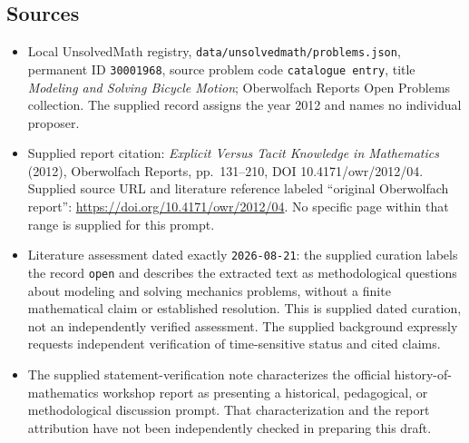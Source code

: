 \documentclass[11pt]{article}
\begin{document}
\subsection{Sources}
\begin{itemize}
\item Local UnsolvedMath registry, \texttt{data/unsolvedmath/problems.json}, permanent ID \texttt{30001968}, source problem code \texttt{catalogue entry}, title \emph{Modeling and Solving Bicycle Motion}; Oberwolfach Reports Open Problems collection. The supplied record assigns the year 2012 and names no individual proposer.
\item Supplied report citation: \emph{Explicit Versus Tacit Knowledge in Mathematics} (2012), Oberwolfach Reports, pp.~131--210, DOI 10.4171/owr/2012/04. Supplied source URL and literature reference labeled ``original Oberwolfach report'': \url{https://doi.org/10.4171/owr/2012/04}. No specific page within that range is supplied for this prompt.
\item Literature assessment dated exactly \texttt{2026-08-21}: the supplied curation labels the record \texttt{open} and describes the extracted text as methodological questions about modeling and solving mechanics problems, without a finite mathematical claim or established resolution. This is supplied dated curation, not an independently verified assessment. The supplied background expressly requests independent verification of time-sensitive status and cited claims.
\item The supplied statement-verification note characterizes the official history-of-mathematics workshop report as presenting a historical, pedagogical, or methodological discussion prompt. That characterization and the report attribution have not been independently checked in preparing this draft.
\end{itemize}
\end{document}
